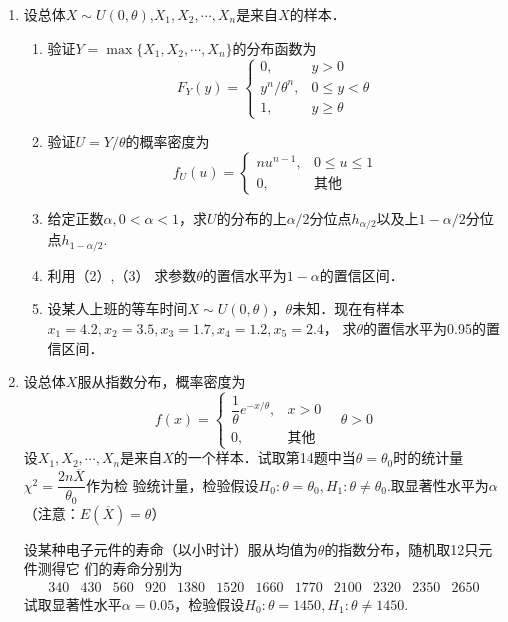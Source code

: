 \documentclass[10pt,a4paper]{article}
\begin{document}
\begin{enumerate}
    \item 设总体$X\sim U(0,\theta)$,$X_1,X_2,\cdots,X_n$是来自$X$的样本．
    \begin{enumerate}
        \item 验证$Y=\max\{X_1,X_2,\cdots,X_n\}$的分布函数为
        $$F_Y(y)=\left\{\begin{array}{ll}
            0, & y>0\\
            y^n/\theta^n, & 0\leq y <\theta\\
            1, &  y\geq \theta
        \end{array}\right.$$
        \item 验证$U=Y/\theta$的概率密度为
        $$f_U(u)=\left\{\begin{array}{ll}
            nu^{n-1}, & 0\leq u \leq 1\\
            0, & \mbox{其他}
        \end{array}\right.$$
        \item 给定正数$\alpha,0<\alpha<1$，求$U$的分布的上$\alpha/2$分位点$h_{\alpha/2}$以及上$1-\alpha/2$分位点$h_{1-\alpha/2}$.
        \item 利用（2）,（3） 求参数$\theta$的置信水平为$1-\alpha$的置信区间．
        \item 设某人上班的等车时间$X\sim U(0,\theta)$，$\theta$未知．现在有样本$x_1=4.2,x_2=3.5,x_3=1.7,x_4=1.2,x_5=2.4$，
        求$\theta$的置信水平为0.95的置信区间．
    \end{enumerate}





    \item 设总体$X$服从指数分布，概率密度为
    $$f(x)=\left\{\begin{array}{ll}
        \dfrac{1}{\theta}e^{-x/\theta}, & x>0\\
        0, & \mbox{其他}
    \end{array}\right.\quad \theta>0$$
    设$X_1,X_2,\cdots,X_n$是来自$X$的一个样本．试取第14题中当$\theta=\theta_0$时的统计量$\chi^2=\dfrac{2n\overline{X}}{\theta_0}$作为检
    验统计量，检验假设$H_0:\theta=\theta_0,H_1:\theta\neq \theta_0$.取显著性水平为$\alpha$（注意：$E(\overline{X})=\theta$）

    设某种电子元件的寿命（以小时计）服从均值为$\theta$的指数分布，随机取12只元件测得它
    们的寿命分别为
    $$\begin{array}{cccccccccccc}
        340 & 430 & 560 & 920 & 1380 & 1520 & 1660 & 1770 & 2100 & 2320 & 2350 & 2650
    \end{array}$$
    试取显著性水平$\alpha=0.05$，检验假设$H_0:\theta=1450,H_1:\theta\neq 1450$.






\end{enumerate}
\end{document}
